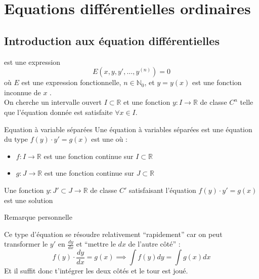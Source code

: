 
\chapter{Equations différentielles ordinaires}
\section{Introduction aux équation différentielles} 
\begin{definition}
     est une expression \[E(x, y, y', \dots, y^{(n)}) = 0 \]
    où $E$ est une expression fonctionnelle, $n \in \mathbb{N}_0$, et $y = y (x)$ est une fonction inconnue de $x$ .\\
    On cherche un intervalle ouvert $I \subset \mathbb{R}$ et une fonction $y : I \to \mathbb{R}$ de classe $C^n$ telle que l'équation donnée est satisfaite $\forall x \in I$.
\end{definition}
\begin{parag}{Equation à variable séparées} 
 Une équation à variables séparées est une équation du type $f(y)\cdot y' = g(x)$ est une  où : 
 \begin{itemize}
     \item $f: I \to \mathbb{R}$ est une fonction continue sur $I \subset \mathbb{R}$
     \item $g: J \to \mathbb{R}$ est une fonction continue sur $J \subset \mathbb{R}$
 \end{itemize}
 Une fonction $y: J' \subset J \to \mathbb{R}$ de classe $C'$ satisfaisant l'équation $f(y)\cdot y' = g(x)$ est une solution
 \begin{subparag}{Remarque personnelle}
     \begin{framedremark}
         Ce type d'équation se résoudre relativement ``rapidement'' car on peut transformer le $y'$ en $\frac{dy}{dx}$ et ``mettre le $dx$ de l'autre côté'' : 
         \[f(y)\cdot\frac{dy}{dx} = g(x) \implies \int f(y)dy = \int g(x) dx\] 
         Et il suffit donc t'intégrer les deux côtés et le tour est joué.
     \end{framedremark}
 \end{subparag}
\end{parag}


